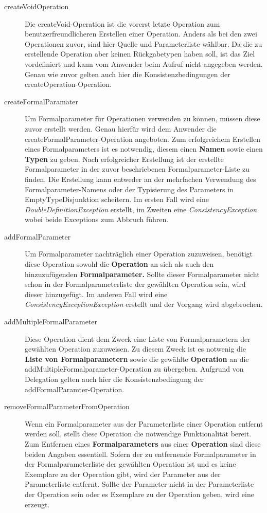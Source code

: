 \begin{description}
\item[createVoidOperation]
Die createVoid-Operation ist die vorerst letzte Operation zum benutzerfreundlicheren Erstellen einer Operation. Anders als bei den zwei Operationen zuvor, sind hier Quelle und Parameterliste wählbar. Da die zu erstellende Operation aber keinen Rückgabetypen haben soll, ist das Ziel vordefiniert und kann vom Anwender beim Aufruf nicht angegeben werden. Genau wie zuvor gelten auch hier die Konsistenzbedingungen der createOperation-Operation.
\item[createFormalParamater]
Um Formalparameter für Operationen verwenden zu können, müssen diese zuvor erstellt werden. Genau hierfür wird dem Anwender die createFormalParameter-Operation angeboten.
Zum erfolgreichem Erstellen eines Formalparameters ist es notwendig, diesem einen \textbf{Namen} sowie einen \textbf{Typen} zu geben. Nach erfolgreicher Erstellung ist der erstellte Formalparameter in der zuvor beschriebenen Formalparameter-Liste zu finden. Die Erstellung kann entweder an der mehrfachen Verwendung des Formalparameter-Namens oder der Typisierung des Parameters in EmptyTypeDisjunktion scheitern. Im ersten Fall wird eine \emph{DoubleDefinitionException} erstellt, im Zweiten eine \emph{ConsistencyException} wobei beide Exceptions zum Abbruch führen.
\item[addFormalParameter]
Um Formalparameter nachträglich einer Operation zuzuweisen, benötigt diese Operation sowohl die \textbf{Operation} an sich als auch den hinzuzufügenden \textbf{Formalparameter.} Sollte dieser Formalparameter nicht schon in der Formalparameterliste der gewählten Operation sein, wird dieser hinzugefügt. Im anderen Fall wird eine \emph{ConsistencyExceptionException} erstellt und der Vorgang wird abgebrochen.
\item[addMultipleFormalParameter]
Diese Operation dient dem Zweck eine Liste von Formalparametern der gewählten Operation zuzuweisen.
Zu diesem Zweck ist es notwenig die \textbf{Liste von Formalparametern} sowie 
die gewählte \textbf{Operation} an die addMultipleFormalparameter-Operation zu übergeben. 
Aufgrund von Delegation gelten auch hier die Konsistenzbedingung der addFormalParamter-Operation. 
\item[removeFormalParameterFromOperation]
Wenn ein Formalparameter aus der Parameterliste einer Operation entfernt werden soll, stellt diese Operation die notwendige Funktionalität bereit. Zum Entfernen eines \textbf{Formalparameters} aus einer \textbf{Operation} sind diese beiden Angaben essentiell. Sofern der zu entfernende Formalparameter in der Formalparameterliste der gewählten Operation ist und es keine Exemplare zu der Operation gibt, wird der Parameter aus der Parameterliste entfernt.
Sollte der Parameter nicht in der Parameterliste der Operation sein oder es Exemplare zu der Operation geben, wird eine  erzeugt.


\end{description}
